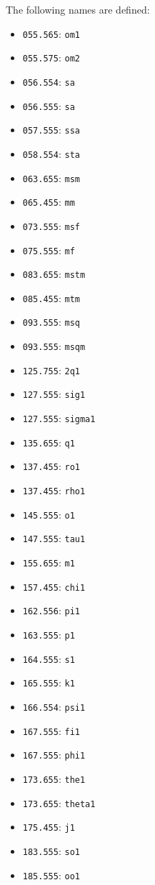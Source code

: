 The following names are defined:
\begin{itemize}
\item \verb|055.565|: \verb|om1|  \item \verb|055.575|: \verb|om2|     \item \verb|056.554|: \verb|sa|
\item \verb|056.555|: \verb|sa|   \item \verb|057.555|: \verb|ssa|     \item \verb|058.554|: \verb|sta|
\item \verb|063.655|: \verb|msm|  \item \verb|065.455|: \verb|mm|      \item \verb|073.555|: \verb|msf|
\item \verb|075.555|: \verb|mf|   \item \verb|083.655|: \verb|mstm|    \item \verb|085.455|: \verb|mtm|
\item \verb|093.555|: \verb|msq|  \item \verb|093.555|: \verb|msqm|    \item \verb|125.755|: \verb|2q1|
\item \verb|127.555|: \verb|sig1| \item \verb|127.555|: \verb|sigma1|  \item \verb|135.655|: \verb|q1|
\item \verb|137.455|: \verb|ro1|  \item \verb|137.455|: \verb|rho1|    \item \verb|145.555|: \verb|o1|
\item \verb|147.555|: \verb|tau1| \item \verb|155.655|: \verb|m1|      \item \verb|157.455|: \verb|chi1|
\item \verb|162.556|: \verb|pi1|  \item \verb|163.555|: \verb|p1|      \item \verb|164.555|: \verb|s1|
\item \verb|165.555|: \verb|k1|   \item \verb|166.554|: \verb|psi1|    \item \verb|167.555|: \verb|fi1|
\item \verb|167.555|: \verb|phi1| \item \verb|173.655|: \verb|the1|    \item \verb|173.655|: \verb|theta1|
\item \verb|175.455|: \verb|j1|   \item \verb|183.555|: \verb|so1|     \item \verb|185.555|: \verb|oo1|

\end{itemize}
